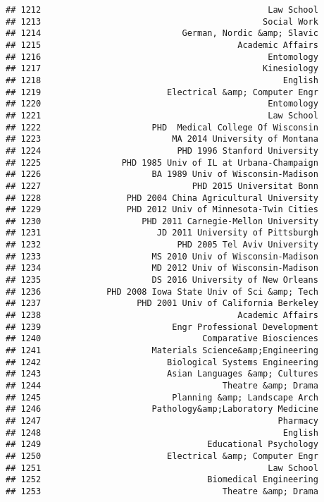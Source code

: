 \documentclass[
]{article}
\begin{document}
\begin{verbatim}
## 1212                                             Law School
## 1213                                            Social Work
## 1214                            German, Nordic &amp; Slavic
## 1215                                       Academic Affairs
## 1216                                             Entomology
## 1217                                            Kinesiology
## 1218                                                English
## 1219                         Electrical &amp; Computer Engr
## 1220                                             Entomology
## 1221                                             Law School
## 1222                      PHD  Medical College Of Wisconsin
## 1223                          MA 2014 University of Montana
## 1224                           PHD 1996 Stanford University
## 1225                PHD 1985 Univ of IL at Urbana-Champaign
## 1226                      BA 1989 Univ of Wisconsin-Madison
## 1227                              PHD 2015 Universitat Bonn
## 1228                 PHD 2004 China Agricultural University
## 1229                 PHD 2012 Univ of Minnesota-Twin Cities
## 1230                    PHD 2011 Carnegie-Mellon University
## 1231                       JD 2011 University of Pittsburgh
## 1232                           PHD 2005 Tel Aviv University
## 1233                      MS 2010 Univ of Wisconsin-Madison
## 1234                      MD 2012 Univ of Wisconsin-Madison
## 1235                      DS 2016 University of New Orleans
## 1236             PHD 2008 Iowa State Univ of Sci &amp; Tech
## 1237                   PHD 2001 Univ of California Berkeley
## 1238                                       Academic Affairs
## 1239                          Engr Professional Development
## 1240                                Comparative Biosciences
## 1241                      Materials Science&amp;Engineering
## 1242                         Biological Systems Engineering
## 1243                         Asian Languages &amp; Cultures
## 1244                                    Theatre &amp; Drama
## 1245                          Planning &amp; Landscape Arch
## 1246                      Pathology&amp;Laboratory Medicine
## 1247                                               Pharmacy
## 1248                                                English
## 1249                                 Educational Psychology
## 1250                         Electrical &amp; Computer Engr
## 1251                                             Law School
## 1252                                 Biomedical Engineering
## 1253                                    Theatre &amp; Drama

\end{verbatim}
\end{document}
